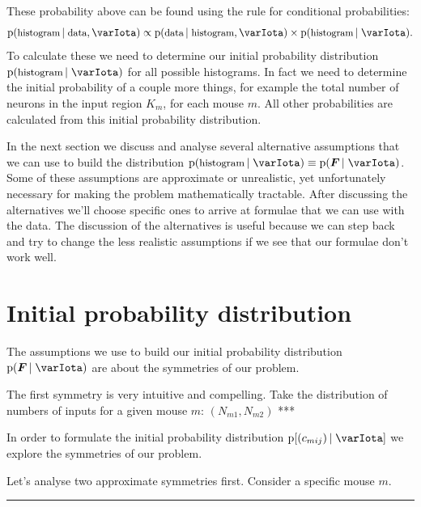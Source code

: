 \documentclass[\ifafour a4paper,12pt,\else a5paper,10pt,\fi%
onecolumn,oneside,article,%
british%
]{memoir}
\theoremstyle{remark}
\theoremstyle{innote}
\newcommand*{\pf}{\mathrm{p}}%
\renewcommand*{\|}[1][]{\nonscript\,#1\vert\nonscript\;\mathopen{}}
\newcommand*{\yI}{\varIota}
\newcommand*{\yc}{c}
\newcommand*{\yN}{N}
\newcommand*{\yF}{\bm{F}}
\begin{document}
These probability above can be found using the rule for conditional
probabilities:
\begin{equation}
  \label{eq:prob_histogram_bayes}
  \pf(\text{\small histogram} \| \text{\small data}, \yI)
  \propto
  \pf(\text{\small data} \| \text{\small histogram}, \yI)
  \times
  \pf(\text{\small histogram} \|  \yI).
\end{equation}
To calculate these we need to determine our initial probability
distribution $\pf(\text{\small histogram} \| \yI)$ for all possible
histograms. In fact we need to determine the initial probability of a
couple more things, for example the total number of neurons in the input
region $K_{m}$, for each mouse $m$. All other probabilities are calculated
from this initial probability distribution.

In the next section we discuss and analyse several alternative assumptions
that we can use to build the distribution
$\pf(\text{\small histogram} \| \yI) \equiv \pf(\yF \| \yI)$. Some of these
assumptions are approximate or unrealistic, yet unfortunately necessary for
making the problem mathematically tractable. After discussing the
alternatives we'll choose specific ones to arrive at formulae that we can
use with the data. The discussion of the alternatives is useful because we
can step back and try to change the less realistic assumptions if we see
that our formulae don't work well.


\section{Initial probability distribution}
\label{sec:init_prob}

The assumptions we use to build our initial probability distribution
$\pf(\yF \| \yI)$ are about the symmetries of our problem.

The first symmetry is very intuitive and compelling. Take the distribution
of numbers of inputs for a given mouse $m$: $(\yN_{m1}, \yN_{m2})$ ***



In order to formulate the initial probability distribution $\pf[(\yc_{mij})
\| \yI]$ we explore the symmetries of our problem.

Let's analyse two approximate symmetries first. Consider a specific mouse
$m$.




\clearpage
\hrule
\end{document}
